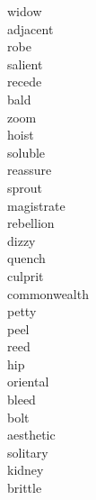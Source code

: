 \documentclass[a4paper, 11pt]{ctexart}
\begin{document}
\begin{multicols*}{3}
\begin{description}
\item[widow]

\item[adjacent]

\item[robe]

\item[salient]

\item[recede]

\item[bald]

\item[zoom]

\item[hoist]

\item[soluble]

\item[reassure]

\item[sprout]

\item[magistrate]

\item[rebellion]

\item[dizzy]

\item[quench]

\item[culprit]

\item[commonwealth]

\item[petty]

\item[peel]

\item[reed]

\item[hip]

\item[oriental]

\item[bleed]

\item[bolt]

\item[aesthetic]

\item[solitary]

\item[kidney]

\item[brittle]


\end{description}
\end{multicols*}
\end{document}
